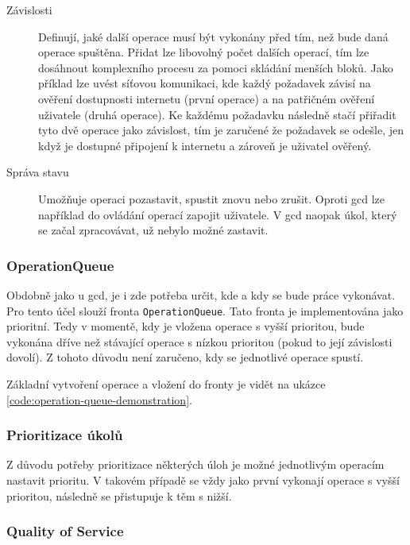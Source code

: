 \begin{description}
  \item[Závislosti] Definují, jaké další operace musí být vykonány před tím, než bude daná operace spuštěna.
  Přidat lze libovolný počet dalších operací, tím lze dosáhnout komplexního procesu za pomoci skládání menších bloků.
  Jako příklad lze uvést síťovou komunikaci, kde každý požadavek závisí na ověření dostupnosti internetu (první operace) a na patřičném ověření uživatele (druhá operace).
  Ke každému požadavku následně stačí přiřadit tyto dvě operace jako závislost, tím je zaručené že požadavek se odešle, jen když je dostupné připojení k internetu a zároveň je uživatel ověřený.
  \item[Správa stavu] Umožňuje operaci pozastavit, spustit znovu nebo zrušit.
  Oproti \acrshort{gcd} lze například do ovládání operací zapojit uživatele.
  V \acrshort{gcd} naopak úkol, který se začal zpracovávat, už nebylo možné zastavit. 
\end{description}

\subsubsection*{OperationQueue}

Obdobně jako u \acrshort{gcd}, je i zde potřeba určit, kde a kdy se bude práce vykonávat.
Pro tento účel slouží fronta \texttt{OperationQueue}.
Tato fronta je implementována jako prioritní.
Tedy v momentě, kdy je vložena operace s vyšší prioritou, bude vykonána dříve než stávající operace s nízkou prioritou (pokud to její závislosti dovolí).
Z tohoto důvodu není zaručeno, kdy se jednotlivé operace spustí.

Základní vytvoření operace a vložení do fronty je vidět na ukázce \ref{code:operation-queue-demonstration}.


\subsubsection*{Prioritizace úkolů}

Z důvodu potřeby prioritizace některých úloh je možné jednotlivým operacím nastavit prioritu.
V takovém případě se vždy jako první vykonají operace s vyšší prioritou, následně se přistupuje k těm s nižší.

\subsubsection*{Quality of Service}

